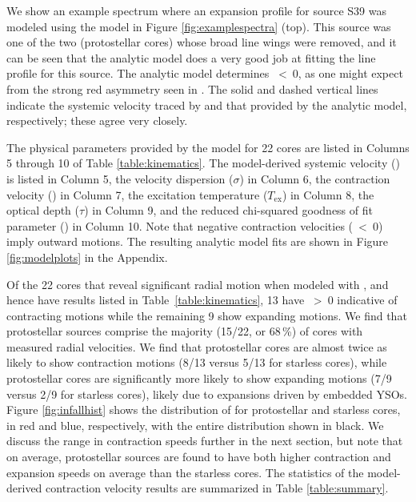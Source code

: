 \documentclass[iop,twocolappendix]{emulateapj}
\begin{document}
We show an example spectrum where an expansion profile for source S39 was modeled using the {\Hill} model in Figure \ref{fig:examplespectra} (top). This source was one of the two (protostellar cores) whose broad line wings were removed, and it can be seen that the {\Hill} analytic model does a very good job at fitting the line profile for this source. The analytic model determines {\Vin}~{\textless}~0, as one might expect from the strong red asymmetry seen in {\HCO}. The solid and dashed vertical lines indicate the systemic velocity traced by {\NtD} and that provided by the analytic model, respectively; these agree very closely. 

The physical parameters provided by the {\Hill} model for 22 cores are listed in Columns 5 through 10 of Table \ref{table:kinematics}. The model-derived systemic velocity ({\Vmod}) is listed in Column 5, the velocity dispersion ($\sigma$) in Column 6, the contraction velocity ({\Vin}) in Column 7, the excitation temperature ($T_\mathrm{ex}$) in Column 8, the optical depth ($\tau$) in Column 9, and the reduced chi-squared goodness of fit parameter ({\redchisq}) in Column 10. Note that negative contraction velocities ({\Vin}~{\textless}~0) imply outward motions. The resulting analytic model fits are shown in Figure \ref{fig:modelplots} in the Appendix.

Of the 22 cores that reveal significant radial motion when modeled with \Hill, and hence have results listed in Table~\ref{table:kinematics}, 13 have {\Vin}~{\textgreater}~0 indicative of contracting motions while the remaining 9 show expanding motions. We find that protostellar sources comprise the majority (15/22, or 68\,\%) of cores with measured radial velocities. We find that protostellar cores are almost twice as likely to show contraction motions (8/13 versus 5/13 for starless cores), while protostellar cores are significantly more likely to show expanding motions (7/9 versus 2/9 for starless cores), likely due to expansions driven by embedded YSOs. Figure \ref{fig:infallhist} shows the distribution of {\Vin} for protostellar and starless cores, in red and blue, respectively, with the entire distribution shown in black. We discuss the range in contraction speeds further in the next section, but note that on average, protostellar sources are found to have both higher contraction and expansion speeds on average than the starless cores. The statistics of the model-derived contraction velocity results are summarized in Table \ref{table:summary}.

\end{document}
